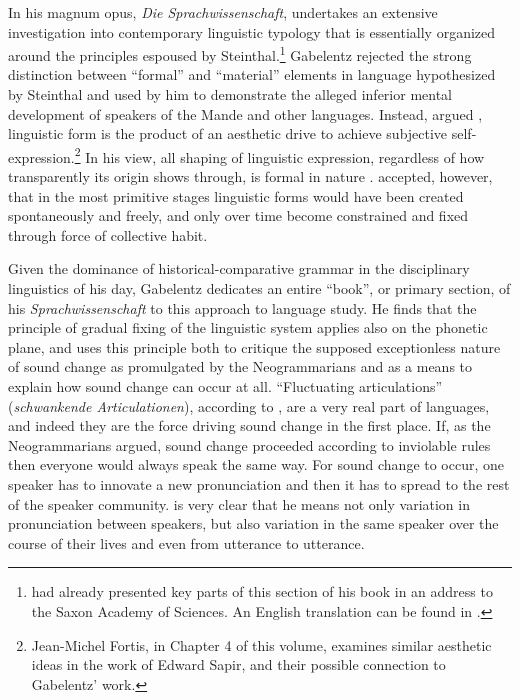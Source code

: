 \documentclass[output=paper]{langscibook}
\begin{document}
In his magnum opus, \emph{Die Sprachwissenschaft}, \citet[341-384]{Gabelentz20161891} undertakes an extensive investigation into contemporary linguistic typology that is essentially organized around the principles espoused by Steinthal.\footnote{\citet{Gabelentz1889} had already presented key parts of this section of his book in an address to the Saxon Academy of Sciences. An English translation can be found in \citet{McElvenny2019}.} Gabelentz rejected the strong distinction between ``formal'' and ``material'' elements in language hypothesized by Steinthal and used by him to demonstrate the alleged inferior mental development of speakers of the Mande and other languages. Instead, argued \citet[380-384]{Gabelentz20161891}, linguistic form is the product of an aesthetic drive to achieve subjective self-expression.\footnote{Jean-Michel Fortis, in Chapter 4 of this volume, examines similar aesthetic ideas in the work of Edward Sapir, and their possible connection to Gabelentz' work.} In his view, all shaping of linguistic expression, regardless of how transparently its origin shows through, is formal in nature \citep[see][]{McElvenny2016}. \citet[406-408]{Gabelentz20161891} accepted, however, that in the most primitive stages linguistic forms would have been created spontaneously and freely, and only over time become constrained and fixed through force of collective habit.

Given the dominance of historical-comparative grammar in the disciplinary linguistics of his day, Gabelentz dedicates an entire ``book'', or primary section, of his \emph{Sprachwissenschaft} to this approach to language study. He finds that the principle of gradual fixing of the linguistic system applies also on the phonetic plane, and uses this principle both to critique the supposed exceptionless nature of sound change as promulgated by the Neogrammarians and as a means to explain how sound change can occur at all. ``Fluctuating articulations'' (\emph{schwankende Articulationen}), according to \citet[196]{Gabelentz20161891}, are a very real part of languages, and indeed they are the force driving sound change in the first place. If, as the Neogrammarians argued, sound change proceeded according to inviolable rules then everyone would always speak the same way. For sound change to occur, one speaker has to innovate a new pronunciation and then it has to spread to the rest of the speaker community. \citet[196-197]{Gabelentz20161891} is very clear that he means not only variation in pronunciation between speakers, but also variation in the same speaker over the course of their lives and even from utterance to utterance.
\end{document}
